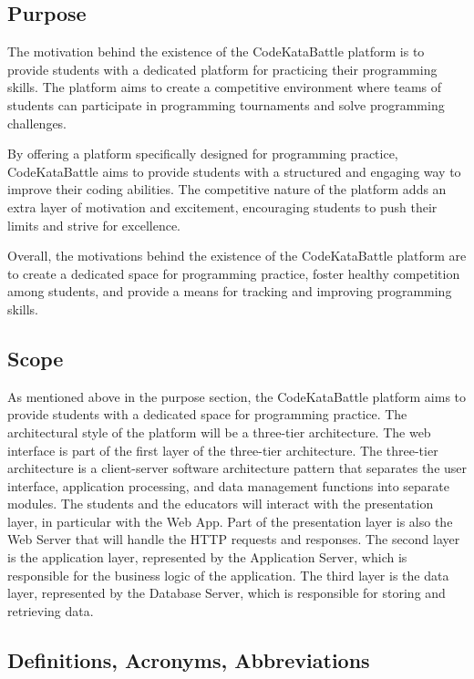 \setlength{\headheight}{13.59999pt}
\addtolength{\topmargin}{-1.59999pt}

\subsection{Purpose}
The motivation behind the existence of the CodeKataBattle platform is to provide students with a dedicated platform for practicing their programming skills. The platform aims to create a competitive environment where teams of students can participate in programming tournaments and solve programming challenges.

By offering a platform specifically designed for programming practice, CodeKataBattle aims to provide students with a structured and engaging way to improve their coding abilities. The competitive nature of the platform adds an extra layer of motivation and excitement, encouraging students to push their limits and strive for excellence.

Overall, the motivations behind the existence of the CodeKataBattle platform are to create a dedicated space for programming practice, foster healthy competition among students, and provide a means for tracking and improving programming skills.

\subsection{Scope}
As mentioned above in the purpose section, the CodeKataBattle platform aims to provide students with a dedicated space for programming practice. The architectural style of the platform will be a three-tier architecture. The web interface is part of the first layer of the three-tier architecture. The three-tier architecture is a client-server software architecture pattern that separates the user interface, application processing, and data management functions into separate modules. The students and the educators will interact with the presentation layer, in particular with the Web App. Part of the presentation layer is also the Web Server that will handle the HTTP requests and responses. The second layer is the application layer, represented by the Application Server, which is responsible for the business logic of the application. The third layer is the data layer, represented by the Database Server, which is responsible for storing and retrieving data.

\subsection{Definitions, Acronyms, Abbreviations}
